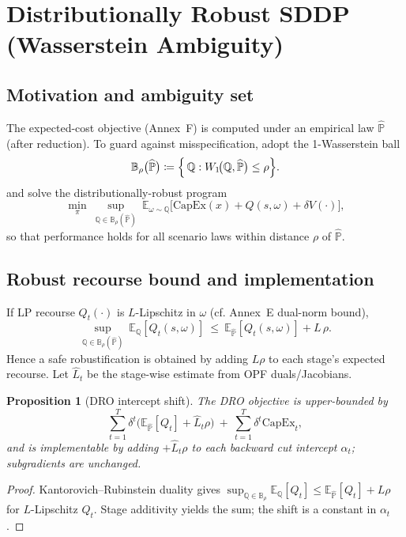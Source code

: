 \documentclass[11pt]{article}
\numberwithin{equation}{section}
\newtheorem{proposition}{Proposition}[section]
\theoremstyle{definition}
\theoremstyle{remark}
\begin{document}
\section{Distributionally Robust SDDP (Wasserstein Ambiguity)}
\label{annex:Wasserstein_Ambiguity}

\subsection{ Motivation and ambiguity set}
The expected-cost objective (Annex~F) is computed under an empirical law $\widehat{\mathbb{P}}$ (after reduction). To guard against misspecification, adopt the 1-Wasserstein ball
\[
\mathbb{B}_{\rho}\bigl(\widehat{\mathbb{P}}\bigr)
\coloneqq
\Bigl\{\,\mathbb{Q} : W_{1}\!\bigl(\mathbb{Q}, \widehat{\mathbb{P}}\bigr) \le \rho \Bigr\}.
\]
and solve the distributionally-robust program
\[
\min_{\pi}\ \sup_{\mathbb{Q}\in \mathbb{B}_{\rho}(\widehat{\mathbb{P}})}
\ \mathbb{E}_{\omega\sim\mathbb{Q}}\!\Big[\mathrm{CapEx}(x)+Q(s,\omega)+\delta V(\cdot)\Big],
\]
so that performance holds for all scenario laws within distance $\rho$ of $\widehat{\mathbb{P}}$.

\subsection{ Robust recourse bound and implementation}
If LP recourse $Q_t(\cdot)$ is $L$-Lipschitz in $\omega$ (cf. Annex~E dual-norm bound),
\[
\sup_{\mathbb{Q}\in\mathbb{B}_\rho(\widehat{\mathbb{P}})}\ \mathbb{E}_{\mathbb{Q}}[Q_t(s,\omega)]
\ \le\ \mathbb{E}_{\widehat{\mathbb{P}}}[Q_t(s,\omega)] + L\,\rho.
\]
Hence a safe robustification is obtained by adding $L\rho$ to each stage’s expected recourse. Let $\widehat L_t$ be the stage-wise estimate from OPF duals/Jacobians.

\begin{proposition}[DRO intercept shift]
The DRO objective is upper-bounded by
\[
\sum_{t=1}^{T}\delta^{t}\!\Big(\mathbb{E}_{\widehat{\mathbb{P}}}[Q_t]+\widehat L_t\rho\Big)
\ +\ \sum_{t=1}^{T}\delta^{t}\mathrm{CapEx}_t,
\]
and is implementable by adding $+\widehat L_t\rho$ to each backward cut intercept $\alpha_t$; subgradients are unchanged.
\end{proposition}

\begin{proof}
Kantorovich–Rubinstein duality gives $\sup_{\mathbb{Q}\in \mathbb{B}_\rho}\mathbb{E}_{\mathbb{Q}}[Q_t]
\le \mathbb{E}_{\widehat{\mathbb{P}}}[Q_t] + L\rho$ for $L$-Lipschitz $Q_t$. Stage additivity yields the sum; the shift is a constant in $\alpha_t$.
\end{proof}
\end{document}
